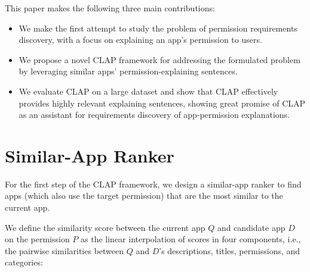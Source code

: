 This paper makes the following three main contributions: 
\begin{itemize}
  \item We make the first attempt to study the problem of permission requirements discovery, with a focus on  %
  explaining an app's permission to users. 
  \item We propose a novel CLAP framework for addressing the formulated problem by leveraging similar apps' permission-explaining sentences.
  \item We evaluate CLAP on a large dataset and show that CLAP effectively provides highly relevant explaining sentences, showing great promise of CLAP as an assistant for requirements discovery of app-permission explanations. 
\end{itemize}




\section{Similar-App Ranker}
\label{sec:similar}

For the first step of the CLAP framework, we design a similar-app ranker to find apps (which also use the target permission) that are the most similar to the current app. 

We define the similarity score between the current app $Q$ and candidate app $D$ on the permission $P$ as the linear interpolation of scores in four components, 
i.e., the pairwise similarities between $Q$ and $D$'s descriptions, titles, permissions, and categories:

